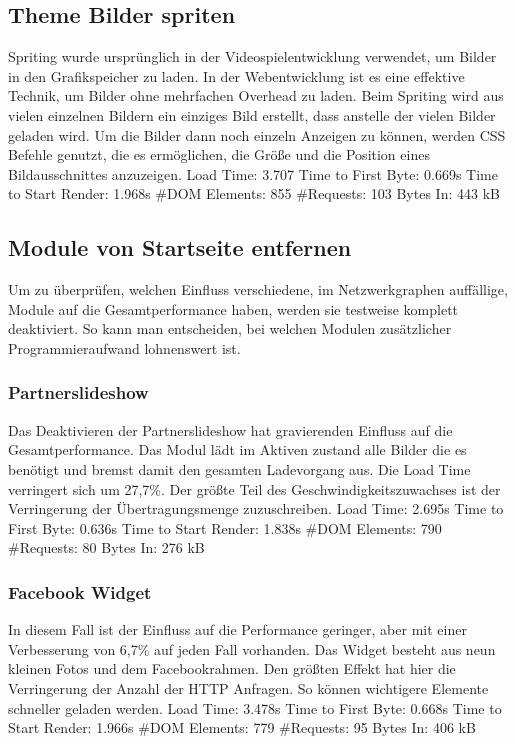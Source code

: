 \subsection{Theme Bilder spriten}
Spriting wurde ursprünglich in der Videospielentwicklung verwendet, um Bilder in den Grafikspeicher zu laden. In der Webentwicklung ist es eine effektive Technik, um Bilder ohne mehrfachen Overhead zu laden. Beim Spriting wird aus vielen einzelnen Bildern ein einziges Bild erstellt, dass anstelle der vielen Bilder geladen wird. Um die Bilder dann noch einzeln Anzeigen zu können, werden CSS Befehle genutzt, die es ermöglichen, die Größe und die Position eines Bildausschnittes anzuzeigen. 
Load Time: 3.707
Time to First Byte: 0.669s %
Time to Start Render: 1.968s
\#DOM Elements: 855 	
\#Requests: 103 
Bytes In: 443 kB 

\subsection{Module von Startseite entfernen}
Um zu überprüfen, welchen Einfluss verschiedene, im Netzwerkgraphen auffällige, Module auf die Gesamtperformance haben, werden sie testweise komplett deaktiviert. So kann man entscheiden, bei welchen Modulen zusätzlicher Programmieraufwand lohnenswert ist.
\subsubsection{Partnerslideshow} Das Deaktivieren der Partnerslideshow hat gravierenden Einfluss auf die Gesamtperformance. Das Modul lädt im Aktiven zustand alle Bilder die es benötigt und bremst damit den gesamten Ladevorgang aus. Die Load Time verringert sich um 27,7\%. Der größte Teil des Geschwindigkeitszuwachses ist der Verringerung der Übertragungsmenge zuzuschreiben. 
Load Time: 2.695s
Time to First Byte: 0.636s %
Time to Start Render: 1.838s
\#DOM Elements: 790
\#Requests: 80
Bytes In: 276 kB

\subsubsection{Facebook Widget} In diesem Fall ist der Einfluss auf die Performance geringer, aber mit einer Verbesserung von 6,7\% auf jeden Fall vorhanden. Das Widget besteht aus neun kleinen Fotos und dem Facebookrahmen. Den größten Effekt hat hier die Verringerung der Anzahl der HTTP Anfragen. So können wichtigere Elemente schneller geladen werden.
Load Time: 3.478s
Time to First Byte: 0.668s %
Time to Start Render: 1.966s
\#DOM Elements: 779 	
\#Requests: 95 
Bytes In: 406 kB 

